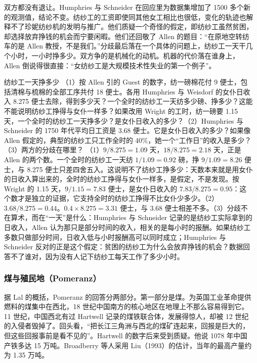 双方都没有退让。Humphries 与 Schneider 在回应里为数据集增加了 1500 多个新的观测值，结论不变。纺纱工的工资即使同其他女工相比也很低，变化的轨迹也解释不了珍妮纺纱机的发明与推广\cite{humphries2019wheel}。他们质疑一个奇怪的假定，即纺纱工虽然贫困，却选择放弃挣钱的机会而宁要闲暇。他们还回敬了 Allen 的题目：“在原地空转纺车的是 Allen 教授，不是我们。”\cite{humphries2019wheel}分歧最后落在一个具体的问题上，纺纱工一天干几个小时，一小时挣多少。双方争的是机械化的动机。机器的代价落在谁身上，Allen 倒说得很直接：“女纺纱工是大规模技术性失业的第一个例子”\cite{allen2018wheels}。

\begin{example}{纺纱工一天挣多少}\label{ex:divergence-spinners}
（1）按 Allen 引的 Guest 的数字，纺一磅棉花付 9 便士，包括清棉与梳棉的全部工序共付 18 便士。各用 Humphries 与 Weisdorf 的女仆日收入 8.275 便士去除，得到多少天？一个全时的纺纱工一天纺多少磅、挣多少？这能不能说明纺纱工挣得与女仆一样多？如果改用 Wright 的工时，纺一磅要 1.15 天，一个全时的纺纱工一天挣多少？是女仆日收入的多少？（2）Humphries 与 Schneider 的 1750 年代平均日工资是 3.68 便士。它是女仆日收入的多少？如果像 Allen 假定的，典型的纺纱工只工作全时的 40\%，她一个“工作日”的收入是多少？（3）两方的分歧在哪里？
\solution （1）$9/8.275=1.09$ 天，$18/8.275=2.18$ 天，正是 Allen 的两个数。一个全时的纺纱工一天纺 $1/1.09=0.92$ 磅，挣 $9/1.09=8.26$ 便士，与 8.275 便士只差四舍五入。这说明不了纺纱工挣多少：天数本来就是用女仆的日收入算出来的，全时的纺纱工挣得与女仆一样多，是假定，不是发现。按 Wright 的 1.15 天，$9/1.15=7.83$ 便士，是女仆日收入的 $7.83/8.275=0.95$：这个数才是独立的证据，它支持全时的纺纱工挣得不比女仆少多少。（2）$3.68/8.275=0.44$。$0.4\times8.275=3.31$ 便士，与 3.68 便士相差不多。（3）分歧不在算术，而在“一天”是什么：Humphries 与 Schneider 记录的是纺纱工实际拿到的日收入，Allen 认为那只是部分时间的收入，相关的是每小时的报酬。如果纺纱工多数只做部分时间，日收入低与小时报酬高可以同时成立；Humphries 与 Schneider 反对的正是这个假定：贫困的纺纱工为什么会放弃挣钱的机会？数据回答不了谁对，因为没有人记下纺纱工每天工作了多少小时。
\end{example}

\subsubsection{煤与殖民地（Pomeranz）}
据 Lal 的概括，Pomeranz 的回答分两部分\cite{pomeranz2000,lal2000}。第一部分是煤。为英国工业革命提供燃料的煤集中在西北，18 世纪中国南方的核心地区在地理上不那么容易得到它。11 世纪，中国西北有过 Hartwell 记录的煤铁联合体，发展得惊人，却被 12 世纪的入侵者毁掉了。回头看，“把长江三角洲与西北的煤矿连起来，回报是巨大的，但这些回报事前是看不见的”\cite{lal2000}。Hartwell 的数字后来受到质疑。他说 1078 年中国产铁多达 15 万吨。Broadberry 等人采用 Liu（1993）的估计，当年的最高产量约为 1.35 万吨\cite{bgl2017}。

